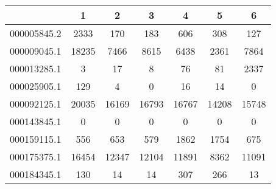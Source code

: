 \begin{tabular}{|l||c|c|c|c|c|c|}
\hline
& 1 & 2 & 3 & 4 & 5 & 6 \\
\hline
\hline
000005845.2 & \cellcolor[RGB]{235, 71, 71} 2333 & \cellcolor[RGB]{232, 232, 252} 170 & \cellcolor[RGB]{237, 237, 253} 183 & \cellcolor[RGB]{235, 71, 71} 606 & \cellcolor[RGB]{252, 232, 232} 308 & \cellcolor[RGB]{218, 218, 251} 127 \\
\hline
000009045.1 & \cellcolor[RGB]{235, 71, 71} 18235 & \cellcolor[RGB]{250, 250, 254} 7466 & \cellcolor[RGB]{251, 218, 218} 8615 & \cellcolor[RGB]{223, 223, 251} 6438 & \cellcolor[RGB]{94, 94, 237} 2361 & \cellcolor[RGB]{254, 246, 246} 7864 \\
\hline
000013285.1 & \cellcolor[RGB]{227, 227, 252} 3 & \cellcolor[RGB]{237, 237, 253} 17 & \cellcolor[RGB]{232, 232, 252} 8 & \cellcolor[RGB]{253, 237, 237} 76 & \cellcolor[RGB]{252, 232, 232} 81 & \cellcolor[RGB]{235, 71, 71} 2337 \\
\hline
000025905.1 & \cellcolor[RGB]{235, 71, 71} 129 & \cellcolor[RGB]{241, 241, 253} 4 & \cellcolor[RGB]{227, 227, 252} 0 & \cellcolor[RGB]{252, 232, 232} 16 & \cellcolor[RGB]{253, 237, 237} 14 & \cellcolor[RGB]{227, 227, 252} 0 \\
\hline
000092125.1 & \cellcolor[RGB]{235, 71, 71} 20035 & \cellcolor[RGB]{241, 241, 253} 16169 & \cellcolor[RGB]{253, 237, 237} 16793 & \cellcolor[RGB]{253, 241, 241} 16767 & \cellcolor[RGB]{94, 94, 237} 14208 & \cellcolor[RGB]{227, 227, 252} 15748 \\
\hline
000143845.1 & \cellcolor[RGB]{255, 255, 255} 0 & \cellcolor[RGB]{255, 255, 255} 0 & \cellcolor[RGB]{255, 255, 255} 0 & \cellcolor[RGB]{255, 255, 255} 0 & \cellcolor[RGB]{255, 255, 255} 0 & \cellcolor[RGB]{255, 255, 255} 0 \\
\hline
000159115.1 & \cellcolor[RGB]{214, 214, 250} 556 & \cellcolor[RGB]{250, 250, 254} 653 & \cellcolor[RGB]{223, 223, 251} 579 & \cellcolor[RGB]{235, 71, 71} 1862 & \cellcolor[RGB]{235, 71, 71} 1754 & \cellcolor[RGB]{254, 250, 250} 675 \\
\hline
000175375.1 & \cellcolor[RGB]{235, 71, 71} 16454 & \cellcolor[RGB]{253, 237, 237} 12347 & \cellcolor[RGB]{254, 250, 250} 12104 & \cellcolor[RGB]{250, 250, 254} 11891 & \cellcolor[RGB]{94, 94, 237} 8362 & \cellcolor[RGB]{223, 223, 251} 11091 \\
\hline
000184345.1 & \cellcolor[RGB]{252, 232, 232} 130 & \cellcolor[RGB]{232, 232, 252} 14 & \cellcolor[RGB]{232, 232, 252} 14 & \cellcolor[RGB]{235, 71, 71} 307 & \cellcolor[RGB]{246, 177, 177} 266 & \cellcolor[RGB]{232, 232, 252} 13 \\

\end{tabular}
